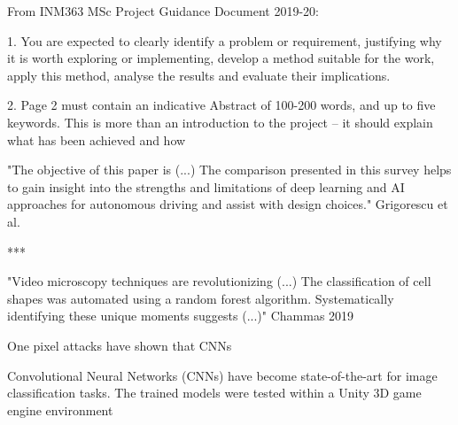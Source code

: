 From INM363 MSc Project Guidance Document 2019-20:  

1. You are expected to clearly identify a problem or requirement, justifying why it is worth exploring or implementing, develop a method suitable for the work, apply this method, analyse the results and evaluate their implications.  

2. Page 2 must contain an indicative Abstract of 100-200 words, and up to five keywords. This is
more than an introduction to the project – it should explain what has been achieved and how

"The objective of this paper is (...)
The comparison presented in this survey helps to gain insight into the strengths and limitations of deep learning and AI approaches for autonomous driving and assist with design choices."  Grigorescu et al.

***

"Video microscopy techniques are revolutionizing (...) 
The classification of cell shapes was automated using a random forest algorithm.
Systematically identifying these unique moments suggests (...)" Chammas 2019

One pixel attacks have shown that CNNs

Convolutional Neural Networks (CNNs) have become state-of-the-art for image classification tasks.
The trained models were tested within a Unity 3D game engine environment
